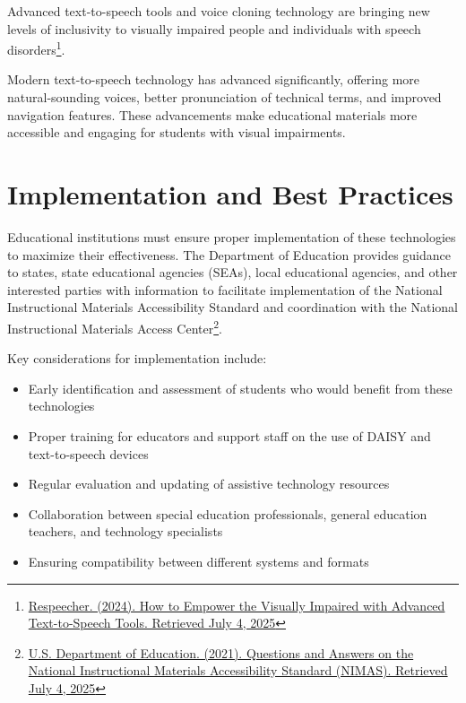 Advanced text-to-speech tools and voice cloning technology are bringing new levels of inclusivity to visually impaired people and individuals with speech disorders\footnote{\href{https://www.respeecher.com/blog/empower-the-visually-impaired-advanced-text-to-speech-tools}{Respeecher. (2024). How to Empower the Visually Impaired with Advanced Text-to-Speech Tools. Retrieved July 4, 2025}}.

Modern text-to-speech technology has advanced significantly, offering more natural-sounding voices, better pronunciation of technical terms, and improved navigation features. These advancements make educational materials more accessible and engaging for students with visual impairments.

\section{Implementation and Best Practices}\label{implementation}

Educational institutions must ensure proper implementation of these technologies to maximize their effectiveness. The Department of Education provides guidance to states, state educational agencies (SEAs), local educational agencies, and other interested parties with information to facilitate implementation of the National Instructional Materials Accessibility Standard and coordination with the National Instructional Materials Access Center\footnote{\href{https://sites.ed.gov/idea/idea-files/questions-and-answers-on-the-national-instructional-materials-accessibility-standard-nimas-aug-9-2021/}{U.S. Department of Education. (2021). Questions and Answers on the National Instructional Materials Accessibility Standard (NIMAS). Retrieved July 4, 2025}}.

Key considerations for implementation include:

\begin{itemize}
    \item Early identification and assessment of students who would benefit from these technologies
    \item Proper training for educators and support staff on the use of DAISY and text-to-speech devices
    \item Regular evaluation and updating of assistive technology resources
    \item Collaboration between special education professionals, general education teachers, and technology specialists
    \item Ensuring compatibility between different systems and formats
\end{itemize}

